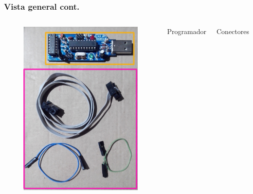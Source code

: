 \begin{frame}
\frametitle{Vista general cont.}
\begin{columns}
\begin{figure}
\centering
\includegraphics[scale=.09]{programador}
\end{figure}
\textcolor{naranja}{Programador}

\textcolor{violeta}{Conectores}
\end{columns}
\end{frame}